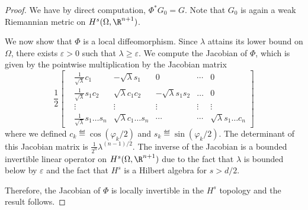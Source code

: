 \begin{proof}
%

We have by direct computation, $\Phi^*G_0 = G$. Note that $G_0$ is again a weak Riemannian metric on $H^{s}(\Omega,\R^{n+1})$.


We now show that $\Phi$ is a local diffeomorphism. Since $\lambda$ attains its lower bound on $\Omega$, there exists $\varepsilon >0 $ such that  $\lambda \geq \varepsilon$. We  compute the Jacobian of $\Phi$, which is given by the pointwise multiplication by the Jacobian matrix 
\begin{equation*}
\frac{1}{2}
\begin{bmatrix} & \frac 1 {\sqrt{\lambda}} c_1  &-\sqrt{\lambda} s_1 & 0  &\cdots  &0 
\\
&\frac 1 {\sqrt{\lambda}}  s_1 c_2  &\sqrt{\lambda} c_1 c_2 &-\sqrt{\lambda} s_1 s_2  &\ldots &0 \\
& \vdots  &\vdots & \vdots & \vdots & \vdots \\
 & \frac{1}{\sqrt{\lambda}} s_1 \ldots s_n &\sqrt{\lambda} c_1 \ldots s_n &\cdots &\cdots  &\sqrt{\lambda} s_1 \ldots c_n 
\end{bmatrix}
\end{equation*}
where we defined $c_k \eqdef \cos(\varphi_k/2)$ and $s_k \eqdef \sin(\varphi_k/2)$.
The determinant of this Jacobian matrix is $\frac 1{2^n} \lambda^{(n-1)/2}$. The inverse of the Jacobian is a bounded invertible linear operator on $H^{s}(\Omega,\R^{n+1}) $ due to the fact that $\lambda$ is bounded below by $\varepsilon$ and the fact that $H^s$ is a Hilbert algebra for $s>d/2$.


Therefore, the Jacobian of $\Phi$ is locally invertible in the $H^s$ topology and the result follows. \end{proof}


